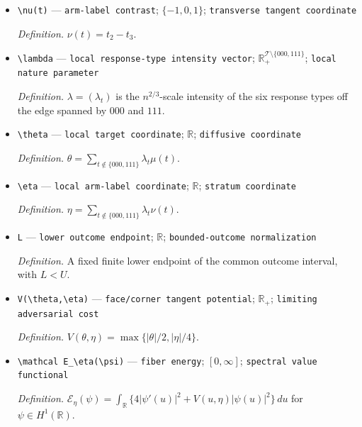 \documentclass{article}
\begin{document}
\begin{itemize}
  \par\smallskip\noindent\emph{Definition.} The eight-type orbit-game value with the multinomial law of \(r\) induced by \(\mathcal D_q\).
  \item \texttt{\textbackslash{}\allowbreak{}nu(t)} --- \texttt{arm-\allowbreak{}label contrast}; \(\{-1,0,1\}\); \texttt{transverse tangent coordinate}
  \par\smallskip\noindent\emph{Definition.} \(\nu(t)=t_2-t_3\).
  \item \texttt{\textbackslash{}\allowbreak{}lambda} --- \texttt{local response-\allowbreak{}type intensity vector}; \(\mathbb R_+^{\mathcal T\setminus\{000,111\}}\); \texttt{local nature parameter}
  \par\smallskip\noindent\emph{Definition.} \(\lambda=(\lambda_t)\) is the \(n^{2/3}\)-scale intensity of the six response types off the edge spanned by \(000\) and \(111\).
  \item \texttt{\textbackslash{}\allowbreak{}theta} --- \texttt{local target coordinate}; \(\mathbb R\); \texttt{diffusive coordinate}
  \par\smallskip\noindent\emph{Definition.} \(\theta=\sum_{t\notin\{000,111\}}\lambda_t\mu(t)\).
  \item \texttt{\textbackslash{}\allowbreak{}eta} --- \texttt{local arm-\allowbreak{}label coordinate}; \(\mathbb R\); \texttt{stratum coordinate}
  \par\smallskip\noindent\emph{Definition.} \(\eta=\sum_{t\notin\{000,111\}}\lambda_t\nu(t)\).
  \item \texttt{L} --- \texttt{lower outcome endpoint}; \(\mathbb R\); \texttt{bounded-\allowbreak{}outcome normalization}
  \par\smallskip\noindent\emph{Definition.} A fixed finite lower endpoint of the common outcome interval, with \(L<U\).
  \item \texttt{V(\textbackslash{}\allowbreak{}theta,\allowbreak{}\textbackslash{}\allowbreak{}eta)} --- \texttt{face/\allowbreak{}corner tangent potential}; \(\mathbb R_+\); \texttt{limiting adversarial cost}
  \par\smallskip\noindent\emph{Definition.} \(V(\theta,\eta)=\max\{|\theta|/2,|\eta|/4\}\).
  \item \texttt{\textbackslash{}\allowbreak{}mathcal E\_\allowbreak{}\textbackslash{}\allowbreak{}eta(\textbackslash{}\allowbreak{}psi)} --- \texttt{fiber energy}; \([0,\infty]\); \texttt{spectral value functional}
  \par\smallskip\noindent\emph{Definition.} \(\mathcal E_\eta(\psi)=\int_{\mathbb R}\{4|\psi'(u)|^2+V(u,\eta)|\psi(u)|^2\}\,du\) for \(\psi\in H^1(\mathbb R)\).

\end{itemize}
\end{document}
